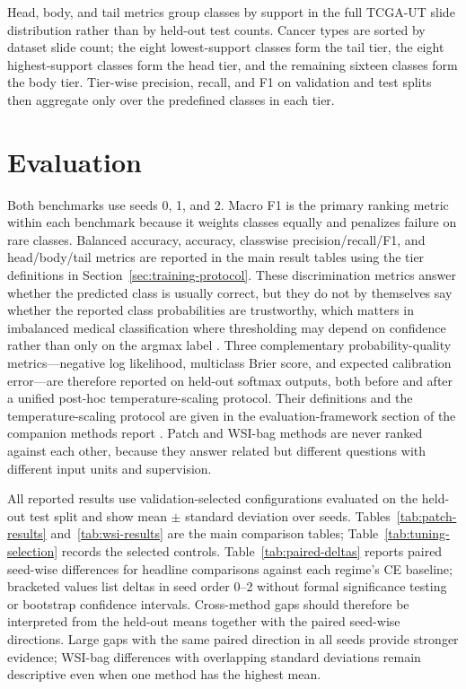 \documentclass[11pt]{article}
\begin{document}
Head, body, and tail metrics group classes by support in the full TCGA-UT slide distribution rather than by held-out test counts. Cancer types are sorted by dataset slide count; the eight lowest-support classes form the tail tier, the eight highest-support classes form the head tier, and the remaining sixteen classes form the body tier. Tier-wise precision, recall, and F1 on validation and test splits then aggregate only over the predefined classes in each tier.

\section{Evaluation}
\label{sec:evaluation}
Both benchmarks use seeds 0, 1, and 2. Macro F1 is the primary ranking metric within each benchmark because it weights classes equally and penalizes failure on rare classes. Balanced accuracy, accuracy, classwise precision/recall/F1, and head/body/tail metrics are reported in the main result tables using the tier definitions in Section~\ref{sec:training-protocol}. These discrimination metrics answer whether the predicted class is usually correct, but they do not by themselves say whether the reported class probabilities are trustworthy, which matters in imbalanced medical classification where thresholding may depend on confidence rather than only on the argmax label \citep{mosquera2024classImbalance}. Three complementary probability-quality metrics---negative log likelihood, multiclass Brier score, and expected calibration error---are therefore reported on held-out softmax outputs, both before and after a unified post-hoc temperature-scaling protocol. Their definitions and the temperature-scaling protocol are given in the evaluation-framework section of the companion methods report \citep{queisler2026imbalanceMethods}. Patch and WSI-bag methods are never ranked against each other, because they answer related but different questions with different input units and supervision.

All reported results use validation-selected configurations evaluated on the held-out test split and show mean $\pm$ standard deviation over seeds. Tables~\ref{tab:patch-results} and~\ref{tab:wsi-results} are the main comparison tables; Table~\ref{tab:tuning-selection} records the selected controls. Table~\ref{tab:paired-deltas} reports paired seed-wise differences for headline comparisons against each regime's CE baseline; bracketed values list deltas in seed order 0--2 without formal significance testing or bootstrap confidence intervals. Cross-method gaps should therefore be interpreted from the held-out means together with the paired seed-wise directions. Large gaps with the same paired direction in all seeds provide stronger evidence; WSI-bag differences with overlapping standard deviations remain descriptive even when one method has the highest mean.
\end{document}
